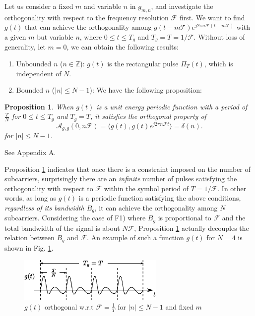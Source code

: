 \documentclass[journal]{IEEEtran}
\newtheorem{prop}{Proposition}
\begin{document}
Let us consider a fixed $m$ and variable $n$ in $g_{m,n}$, and investigate the orthogonality with respect to the frequency resolution $\mathcal F$ first. We want to find $g(t)$ that can achieve the orthogonality among $g(t-m\mathcal T)e^{j2\pi n \mathcal F (t-m\mathcal T)}$ with a given $m$ but variable $n$, where $0\le  t \le T_g$ and $T_g= T=1/\mathcal F$. Without loss of generality, let $m=0$, we can obtain the following results:
\renewcommand{\labelenumi}{F\arabic{enumi})}
\begin{enumerate}
  \item Unbounded $n$ ($n\in \mathbb Z$):  
        $g(t)$ is the rectangular pulse $\Pi_T(t)$, which is independent of $N$.

  \item Bounded $n$ ($|n|\le N-1$): We have the following proposition:        
\end{enumerate}
\begin{prop}\label{l1}
          When $g(t)$ is a {unit energy} periodic function with a period of $\frac{T}{N}$ for $0\le  t \le T_g$ and $T_g=T$, it satisfies the orthogonal property of
          \begin{equation}
            \mathcal A_{g,g}\left(0, n\mathcal F\right)= \langle g(t), g(t)e^{j2\pi n\mathcal Ft} \rangle=\delta(n).
          \end{equation}
          for $|n|\le N-1$.          
        \end{prop}
        \begin{IEEEproof}
          See Appendix A.           
        \end{IEEEproof}
Proposition \ref{l1} indicates that once there is a constraint imposed on the number of subcarriers, surprisingly there are an \emph{infinite} number of pulses satisfying the orthogonality with respect to $\mathcal F$ within the symbol period of $T=1/\mathcal F$. In other words, as long as $g(t)$ is a periodic function satisfying the above conditions, \emph{regardless of its bandwidth $B_g$}, it can achieve the orthogonality among $N$ subcarriers.
Considering the case of F1) where $B_g$ is proportional to $\mathcal F$ and the {total bandwidth of the signal} is about $N\mathcal F$, Proposition \ref{l1} actually decouples the relation between $B_g$ and $\mathcal F$. An example of such a function $g(t)$ for $N=4$ is shown in Fig. \ref{gtF2}.

\begin{figure}[t]
  \centering
  \includegraphics[width=7cm]{govf}
  \caption{$g(t)$ orthogonal w.r.t $\mathcal F=\frac{1}{T}$ for $|n|\le N-1$ and fixed $m$}
  \label{gtF2}
\end{figure}
\end{document}
